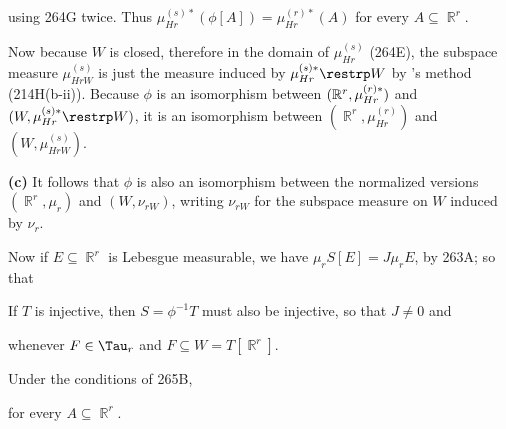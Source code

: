 {\noindent using 264G twice.   Thus
$\mu_{Hr}^{(s)*}(\phi[A])=\mu_{Hr}^{(r)*}(A)$ for
every $A\subseteq \BbbR^r$.

\medskip

 Now because $W$ is closed, therefore in the domain of
$\mu_{Hr}^{(s)}$ (264E), the subspace measure $\mu_{HrW}^{(s)}$ is
just
the measure induced by $\mu_{Hr}^{(s)*}\restrp W$ by \Caratheodory's
method (214H(b-ii)).   Because $\phi$ is an isomorphism between
$(\Bbb R^r,\mu_{Hr}^{(r)*})$ and $(W,\mu_{Hr}^{(s)*}\restrp W)$, it
is an
isomorphism between $(\BbbR^r,\mu_{Hr}^{(r)})$ and
$(W,\mu_{HrW}^{(s)})$.
\Qed

\medskip

{\bf (c)}  It follows that $\phi$ is also an isomorphism between the
normalized versions $(\BbbR^r,\mu_r)$ and $(W,\nu_{rW})$, writing
$\nu_{rW}$ for the subspace measure on $W$ induced by $\nu_r$.

Now if $E\subseteq\BbbR^r$ is  Lebesgue measurable, we have
$\mu_rS[E]=J\mu_rE$, by 263A;  so that


\noindent If $T$ is injective, then $S=\phi^{-1}T$ must also be
injective, so that $J\ne 0$ and


\noindent whenever $F\in\Tau_r$ and $F\subseteq W=T[\BbbR^r]$.
}%

 Under the conditions of 265B,


\noindent for every $A\subseteq\BbbR^r$.


